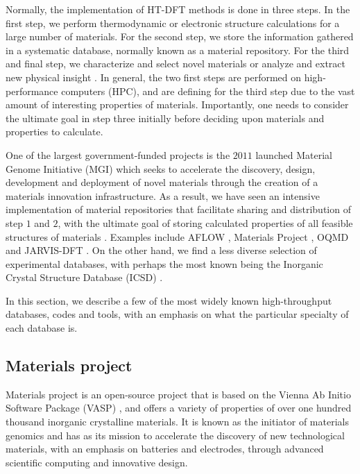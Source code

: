 Normally, the implementation of HT-DFT methods is done in three steps. In the first step, we perform thermodynamic or electronic structure calculations for a large number of materials. For the second step, we store the information gathered in a systematic database, normally known as a material repository. For the third and final step, we characterize and select novel materials or analyze and extract new physical insight \cite{Schleder2019}. In general, the two first steps are performed on high-performance computers (HPC), and are defining for the third step due to the vast amount of interesting properties of materials. Importantly, one needs to consider the ultimate goal in step three initially before deciding upon materials and properties to calculate.

One of the largest government-funded projects is the $2011$ launched Material Genome Initiative (MGI) \cite{Warren2018} which seeks to accelerate the discovery, design, development and deployment of novel materials through the creation of a materials innovation infrastructure.
As a result, we have seen an intensive implementation of material repositories that facilitate sharing and distribution of step $1$ and $2$, with the ultimate goal of storing calculated properties of all feasible structures of materials \cite{Schuett2020}.
Examples include AFLOW \cite{Curtarolo2012, Curtarolo2012a, Calderon2015}, Materials Project \cite{Jain2013, Jain2018} , OQMD \cite{Saal2013, Kirklin2015} and JARVIS-DFT \cite{Choudhary2020}.
On the other hand, we find a less diverse selection of experimental databases, with perhaps the most known being the Inorganic Crystal Structure Database (ICSD) \cite{Allen1987}.

In this section, we describe a few of the most widely known high-throughput databases, codes and tools, with an emphasis on what the particular specialty of each database is.

\subsection{Materials project}

Materials project \cite{Jain2013, Jain2018} is an open-source project that is based on the Vienna Ab Initio Software Package (VASP) \cite{Kresse1996}, and offers a variety of properties of over one hundred thousand inorganic crystalline materials. It is known as the initiator of materials genomics and has as its mission to accelerate the discovery of new technological materials, with an emphasis on batteries and electrodes, through advanced scientific computing and innovative design.

